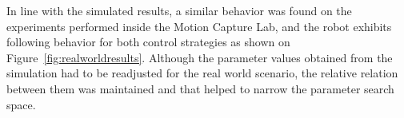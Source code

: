 \documentclass[journal]{IEEEtran}
\begin{document}











In line with the simulated results, a similar behavior was found on the experiments performed inside the Motion Capture Lab, and the robot exhibits following behavior for both control strategies as shown on Figure~\ref{fig:realworldresults}.   Although the parameter values obtained from the simulation had to be readjusted for the real world scenario, the relative relation between them was maintained and that helped to narrow the parameter search space.
\end{document}
